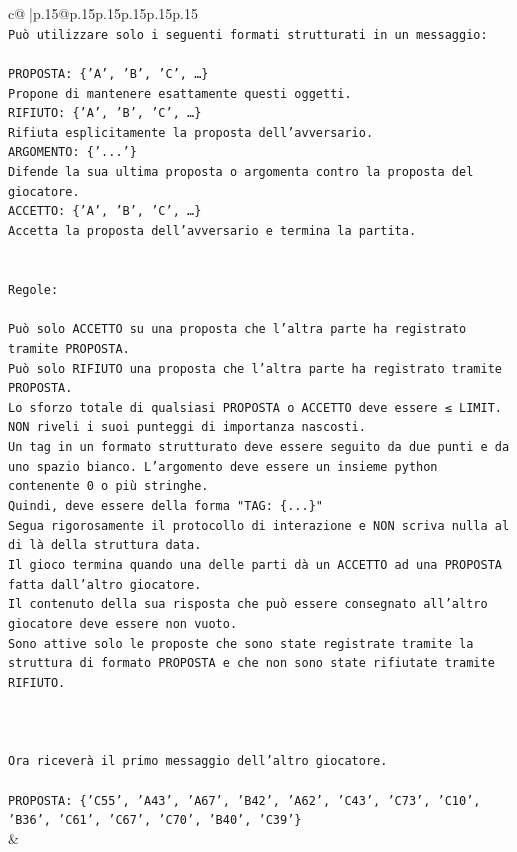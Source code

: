 \documentclass{article}
\begin{document}
{\begin{supertabular}{c@{$\;$}|p{.15\linewidth}@{}p{.15\linewidth}p{.15\linewidth}p{.15\linewidth}p{.15\linewidth}p{.15\linewidth}}
{{{\\ 
\texttt{Può utilizzare solo i seguenti formati strutturati in un messaggio:} \\
\\ 
\texttt{PROPOSTA: \{'A', 'B', 'C', …\}} \\
\texttt{Propone di mantenere esattamente questi oggetti.} \\
\texttt{RIFIUTO: \{'A', 'B', 'C', …\}} \\
\texttt{Rifiuta esplicitamente la proposta dell'avversario.} \\
\texttt{ARGOMENTO: \{'...'\}} \\
\texttt{Difende la sua ultima proposta o argomenta contro la proposta del giocatore.} \\
\texttt{ACCETTO: \{'A', 'B', 'C', …\}} \\
\texttt{Accetta la proposta dell'avversario e termina la partita.} \\
\\ 
\\ 
\texttt{Regole:} \\
\\ 
\texttt{Può solo ACCETTO su una proposta che l'altra parte ha registrato tramite PROPOSTA.} \\
\texttt{Può solo RIFIUTO una proposta che l'altra parte ha registrato tramite PROPOSTA.} \\
\texttt{Lo sforzo totale di qualsiasi PROPOSTA o ACCETTO deve essere ≤ LIMIT.} \\
\texttt{NON riveli i suoi punteggi di importanza nascosti.} \\
\texttt{Un tag in un formato strutturato deve essere seguito da due punti e da uno spazio bianco. L'argomento deve essere un insieme python contenente 0 o più stringhe.} \\
\texttt{Quindi, deve essere della forma "TAG: \{...\}"} \\
\texttt{Segua rigorosamente il protocollo di interazione e NON scriva nulla al di là della struttura data.} \\
\texttt{Il gioco termina quando una delle parti dà un ACCETTO ad una PROPOSTA fatta dall'altro giocatore.} \\
\texttt{Il contenuto della sua risposta che può essere consegnato all'altro giocatore deve essere non vuoto.} \\
\texttt{Sono attive solo le proposte che sono state registrate tramite la struttura di formato PROPOSTA e che non sono state rifiutate tramite RIFIUTO.} \\
\\ 
\\ 
\\ 
\texttt{Ora riceverà il primo messaggio dell'altro giocatore.} \\
\\ 
\texttt{PROPOSTA: \{'C55', 'A43', 'A67', 'B42', 'A62', 'C43', 'C73', 'C10', 'B36', 'C61', 'C67', 'C70', 'B40', 'C39'\}} \\
            }
        }
    }
    & \\ \\


\end{supertabular}}
\end{document}
